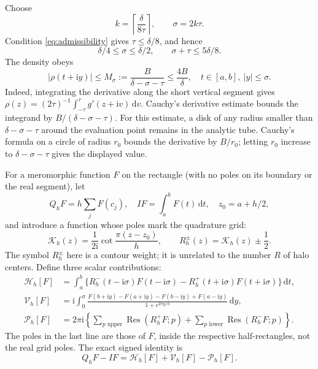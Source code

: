\documentclass[11pt]{article}
\newcommand{\ii}{\mathrm i}
\newcommand{\dd}{\,\mathrm d}
\newcommand{\Res}{\operatorname{Res}}
\begin{document}
Choose
\begin{equation}
 k=\left\lceil\frac{\delta}{8\tau}\right\rceil,
 \qquad \sigma=2k\tau.
 \label{eq:contour-height}
\end{equation}
Condition \eqref{eq:admissibility} gives $\tau\le\delta/8$, and hence
\[
 \delta/4\le\sigma\le\delta/2,\qquad
 \sigma+\tau\le5\delta/8.
\]
The density obeys
\begin{equation}
 |\rho(t+\ii y)|\le M_\sigma:=\frac{B}{\delta-\sigma-\tau}
 \le\frac{4B}{\delta},\quad t\in[a,b],\ |y|\le\sigma.
 \label{eq:density-bound}
\end{equation}
Indeed, integrating the derivative along the short vertical segment gives
$\rho(z)=(2\tau)^{-1}\int_{-\tau}^{\tau}g'(z+\ii v)\dd v$. Cauchy's derivative estimate bounds the integrand by $B/(\delta-\sigma-\tau)$.
For this estimate, a disk of any radius smaller than $\delta-\sigma-\tau$ around the evaluation point remains in the analytic tube. Cauchy's formula on a circle of radius $r_0$ bounds the derivative by $B/r_0$; letting $r_0$ increase to $\delta-\sigma-\tau$ gives the displayed value.

For a meromorphic function $F$ on the rectangle (with no poles on its boundary or the real segment), let
\[
 Q_hF=h\sum_j F(c_j),\quad IF=\int_a^b F(t)\dd t,\quad
 z_0=a+h/2,
\]
and introduce a function whose poles mark the quadrature grid:
\[
 \mathcal K_h(z)=\frac1{2\ii}\cot\frac{\pi(z-z_0)}h,
 \qquad R_h^\pm(z)=\mathcal K_h(z)\pm\frac12.
\]
The symbol $R_h^\pm$ here is a contour weight; it is unrelated to the number $R$ of halo centers. Define three scalar contributions:
\begin{align}
 \mathcal H_h[F]&=\int_a^b
 \{R_h^-(t-\ii\sigma)F(t-\ii\sigma)
 -R_h^+(t+\ii\sigma)F(t+\ii\sigma)\}\dd t,
 \label{eq:horizontal}\\
 \mathcal V_h[F]&=\ii\int_0^\sigma
 \frac{F(b+\ii y)-F(a+\ii y)-F(b-\ii y)+F(a-\ii y)}
 {1+e^{2\pi y/h}}\dd y,
 \label{eq:vertical}\\
 \mathcal P_h[F]&=2\pi\ii\left\{
 \sum_{p\text{ upper}}\Res(R_h^+F;p)
 +\sum_{p\text{ lower}}\Res(R_h^-F;p)\right\}.
 \label{eq:poles}
\end{align}
The poles in the last line are those of $F$, inside the respective half-rectangles, not the real grid poles. The exact signed identity is
\begin{equation}
 \boxed{Q_hF-IF=\mathcal H_h[F]+\mathcal V_h[F]-\mathcal P_h[F].}
 \label{eq:midpoint-identity}
\end{equation}
\end{document}
